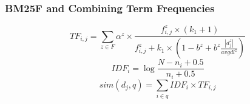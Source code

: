 \documentclass[svgnames]{beamer}
\begin{document}
\begin{frame} \frametitle{BM25F and Combining Term Frequencies}
\begin{block}{}
    \begin{displaymath}
          TF_{i,j} = \sum_{z \in F} \alpha^z \times \frac{f_{i,j}^z \times (k_1 + 1)}
                                  {f_{i,j}^z + k_1 \times \left( 1-b^z+b^z\frac{|d_j^z|}{avgdl^z} \right)}
    \end{displaymath}
    \begin{displaymath}
        IDF_i = \log\frac{N - n_i + 0.5}{n_i + 0.5}
    \end{displaymath}
    \begin{displaymath}
          sim(d_j,q) =
          \sum_{i \in q} IDF_i \times TF_{i,j} 
    \end{displaymath}
\end{block}
\end{frame}

\end{document}
